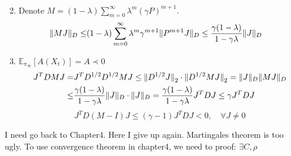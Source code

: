 \begin{enumerate}
\begin{align*}
        \end{align*}
    \item Denote $ M = (1 - \lambda) \sum^{\infty}_{m=0} \lambda^m{(\gamma P)}^{m+1} $.
        \begin{align*}
            \Arrowvert MJ \Arrowvert_D \le& (1 - \lambda) \sum^{\infty}_{m = 0} \lambda^m \gamma^{m+1} \Arrowvert P^{m+1} J \Arrowvert_D \le \frac{\gamma (1 - \lambda)}{1 - \gamma \lambda} \Arrowvert J \Arrowvert_D
        \end{align*}
    \item $ \mathbb{E}_{\pi_{\infty}} \left[ A(X_t) \right] = A \prec 0 $
        \begin{align*}
            J^T D M J =& J^T D^{1/2} D^{1/2} MJ \le {\Arrowvert D^{1/2} J \Arrowvert}_2 \cdot {\Arrowvert D^{1/2} M J \Arrowvert}_2 = \Arrowvert J \Arrowvert_D \Arrowvert MJ \Arrowvert_D \\
            \le& \frac{\gamma(1 - \lambda)}{1 - \gamma\lambda} \Arrowvert J \Arrowvert_D \cdot \Arrowvert J \Arrowvert_D = \frac{\gamma(1 - \lambda)}{1 - \gamma\lambda} J^T D J \le \gamma J^T D J
        \end{align*}
        \[
            J^T D(M-I)J \le (\gamma - 1) J^T D J < 0, \quad \forall J \ne 0
        \]
\end{enumerate}
I need go back to Chapter4.
Here I give up again. Martingales theorem is too ugly.
To use convergence theorem in chapter4, we need to proof: $ \exists C, \rho $
